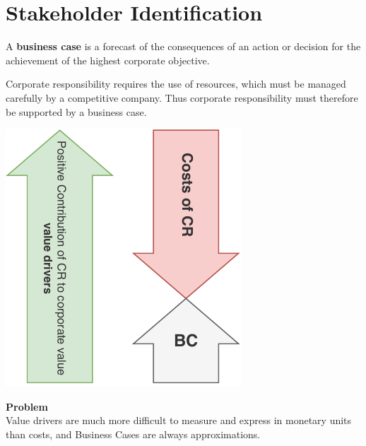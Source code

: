 \documentclass[11pt]{article}
\theoremstyle{definition}
\begin{document}
\clearpage
\section{Stakeholder Identification}
\begin{definition}
	A \textbf{business case} is a forecast of the consequences of an action or decision for the achievement of the highest corporate objective.
\end{definition}

Corporate responsibility requires the use of resources, which must be managed carefully by a competitive company. Thus corporate responsibility must therefore be supported by a business case.

\vspace{1em}
\noindent
\begin{minipage}{0.35\linewidth}
	\centering
	\includegraphics[width=\linewidth]{img/CR_difficulties.pdf}
\end{minipage}
\hfill
\begin{minipage}{0.6\linewidth}
	\textbf{Problem}\\ Value drivers are much more difficult to measure and express in monetary units than costs, and Business Cases are always approximations.
\end{minipage}
\end{document}
